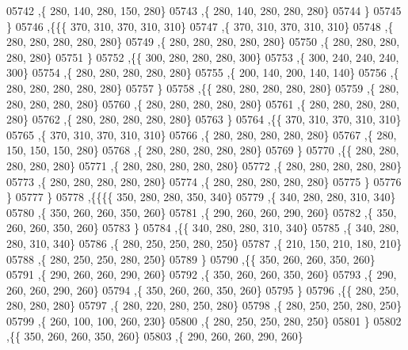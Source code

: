 \begin{DoxyCode}
05742     ,\{   280,   140,   280,   150,   280\}
05743     ,\{   280,   140,   280,   280,   280\}
05744     \}
05745    \}
05746   ,\{\{\{   370,   310,   370,   310,   310\}
05747     ,\{   370,   310,   370,   310,   310\}
05748     ,\{   280,   280,   280,   280,   280\}
05749     ,\{   280,   280,   280,   280,   280\}
05750     ,\{   280,   280,   280,   280,   280\}
05751     \}
05752    ,\{\{   300,   280,   280,   280,   300\}
05753     ,\{   300,   240,   240,   240,   300\}
05754     ,\{   280,   280,   280,   280,   280\}
05755     ,\{   200,   140,   200,   140,   140\}
05756     ,\{   280,   280,   280,   280,   280\}
05757     \}
05758    ,\{\{   280,   280,   280,   280,   280\}
05759     ,\{   280,   280,   280,   280,   280\}
05760     ,\{   280,   280,   280,   280,   280\}
05761     ,\{   280,   280,   280,   280,   280\}
05762     ,\{   280,   280,   280,   280,   280\}
05763     \}
05764    ,\{\{   370,   310,   370,   310,   310\}
05765     ,\{   370,   310,   370,   310,   310\}
05766     ,\{   280,   280,   280,   280,   280\}
05767     ,\{   280,   150,   150,   150,   280\}
05768     ,\{   280,   280,   280,   280,   280\}
05769     \}
05770    ,\{\{   280,   280,   280,   280,   280\}
05771     ,\{   280,   280,   280,   280,   280\}
05772     ,\{   280,   280,   280,   280,   280\}
05773     ,\{   280,   280,   280,   280,   280\}
05774     ,\{   280,   280,   280,   280,   280\}
05775     \}
05776    \}
05777   \}
05778  ,\{\{\{\{   350,   280,   280,   350,   340\}
05779     ,\{   340,   280,   280,   310,   340\}
05780     ,\{   350,   260,   260,   350,   260\}
05781     ,\{   290,   260,   260,   290,   260\}
05782     ,\{   350,   260,   260,   350,   260\}
05783     \}
05784    ,\{\{   340,   280,   280,   310,   340\}
05785     ,\{   340,   280,   280,   310,   340\}
05786     ,\{   280,   250,   250,   280,   250\}
05787     ,\{   210,   150,   210,   180,   210\}
05788     ,\{   280,   250,   250,   280,   250\}
05789     \}
05790    ,\{\{   350,   260,   260,   350,   260\}
05791     ,\{   290,   260,   260,   290,   260\}
05792     ,\{   350,   260,   260,   350,   260\}
05793     ,\{   290,   260,   260,   290,   260\}
05794     ,\{   350,   260,   260,   350,   260\}
05795     \}
05796    ,\{\{   280,   250,   280,   280,   280\}
05797     ,\{   280,   220,   280,   250,   280\}
05798     ,\{   280,   250,   250,   280,   250\}
05799     ,\{   260,   100,   100,   260,   230\}
05800     ,\{   280,   250,   250,   280,   250\}
05801     \}
05802    ,\{\{   350,   260,   260,   350,   260\}
05803     ,\{   290,   260,   260,   290,   260\}

\end{DoxyCode}
